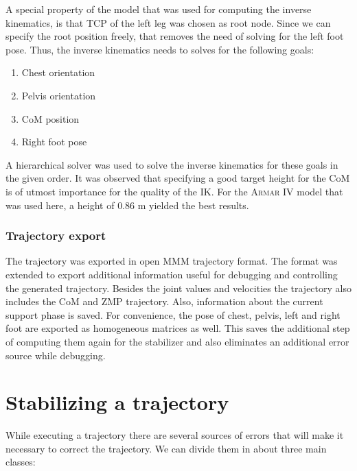 \documentclass[english,ngerman]{KITreprt}
\newcommand{\name}[1]{\textsc{#1}}
\begin{document}
A special property of the model that was used for computing the inverse
kinematics, is that TCP of the left leg was chosen as root node. Since
we can specify the root position freely, that removes the need of
solving for the left foot pose. Thus, the inverse kinematics needs to
solves for the following goals:

\begin{enumerate}
\def\labelenumi{\arabic{enumi}.}
\item
  Chest orientation
\item
  Pelvis orientation
\item
  CoM position
\item
  Right foot pose
\end{enumerate}

A hierarchical solver was used to solve the inverse kinematics for these
goals in the given order. It was observed that specifying a good target
height for the CoM is of utmost importance for the quality of the IK.
For the \name{Armar IV} model that was used here, a height of $0.86$ m
yielded the best results.

\subsection{Trajectory export}\label{trajectory-export}

The trajectory was exported in open \name{MMM} trajectory format. The
format was extended to export additional information useful for
debugging and controlling the generated trajectory. Besides the joint
values and velocities the trajectory also includes the CoM and ZMP
trajectory. Also, information about the current support phase is saved.
For convenience, the pose of chest, pelvis, left and right foot are
exported as homogeneous matrices as well. This saves the additional step
of computing them again for the stabilizer and also eliminates an
additional error source while debugging.

\chapter{Stabilizing a trajectory}\label{stabilizing-a-trajectory}

While executing a trajectory there are several sources of errors that
will make it necessary to correct the trajectory. We can divide them in
about three main classes:
\end{document}
